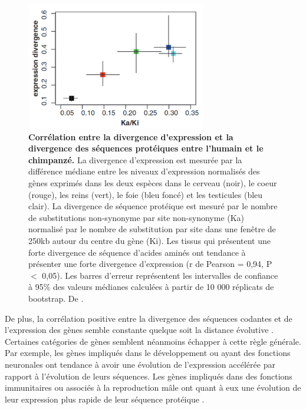 \begin{figure}[h]
    \centering
    \includegraphics[width=0.7\textwidth, page=1] {figures/introduction/fig32.png}
    \caption[Corrélation entre la divergence d'expression et la divergence des séquences protéiques entre l'humain et le chimpanzé.]{
    \textbf{Corrélation entre la divergence d'expression et la divergence des séquences protéiques entre l'humain et le chimpanzé.} La divergence d'expression est mesurée par la différence médiane entre les niveaux d'expression normalisés des gènes exprimés dans les deux espèces dans le cerveau (noir), le coeur (rouge), les reins (vert), le foie (bleu foncé) et les testicules (bleu clair). La divergence de séquence protéique est mesuré par le nombre de substitutions non-synonyme par site non-synonyme (Ka) normalisé par le nombre de substitution par site dans une fenêtre de 250kb autour du centre du gène (Ki). Les tissus qui présentent une forte divergence de séquence d'acides aminés ont tendance à présenter une forte divergence d'expression (r de Pearson = 0,94, P $<$ 0,05). Les barres d'erreur représentent les intervalles de confiance à 95\% des valeurs médianes calculées à partir de 10 000 réplicats de bootstrap. De \citep{khaitovich_parallel_2005}.\\
    }
    \label{fig:Fig32}
\end{figure}

De plus, la corrélation positive entre la divergence des séquences codantes et de l’expression des gènes semble constante quelque soit la distance évolutive \citep{warnefors_evolution_2013}. Certaines catégories de gènes semblent néanmoins échapper à cette règle générale. Par exemple, les gènes impliqués dans le développement ou ayant des fonctions neuronales ont tendance à avoir une évolution de l’expression accélérée par rapport à l’évolution de leurs séquences. Les gènes impliqués dans des fonctions immunitaires ou associés à la reproduction mâle ont quant à eux une évolution de leur expression plus rapide de leur séquence protéique \citep{haygood_contrasts_2010}.


